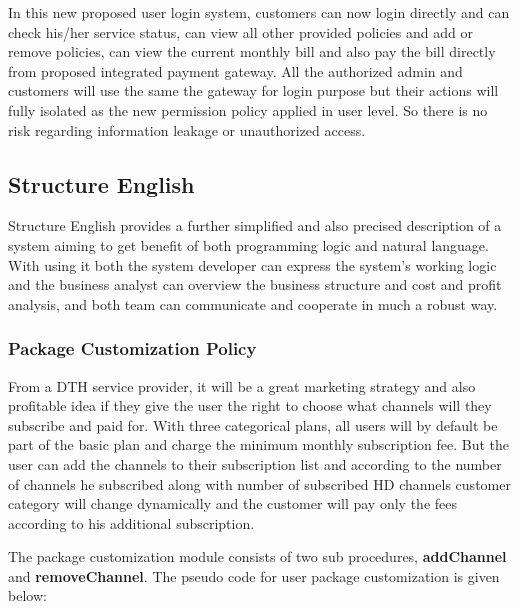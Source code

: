 \begin{spacing}{1}
In this new proposed user login system, customers can now login directly and can check his/her service status, can view all other provided policies and add or remove policies, can view the current monthly bill and also pay the bill directly from proposed integrated payment gateway. All the authorized admin and customers will use the same the gateway for login purpose but their actions will fully isolated as the new permission policy applied in user level. So there is no risk regarding information leakage or unauthorized  access.

\subsection{Structure English}
Structure English provides a further simplified and also precised description of a system aiming to get benefit of both programming logic and natural language. With using it both the system developer can express the system's working logic and the business analyst can overview the business structure and cost and profit analysis, and both team can communicate and cooperate in much a robust way.  
\subsubsection{Package Customization Policy}
From a DTH service provider, it will be a great marketing strategy and also profitable idea if they give the user the right to choose what channels will they subscribe and paid for. With three categorical plans, all users will by default be part of the basic plan and charge the minimum monthly subscription fee. But the user can add the channels to their subscription list and according to the number of channels he subscribed along with number of subscribed HD channels customer category will change dynamically and the customer will pay only the fees according to his additional subscription.

The package customization module consists of two sub procedures, \textbf{addChannel} and \textbf{removeChannel}. The pseudo code for user package customization is given below:


\end{spacing}
